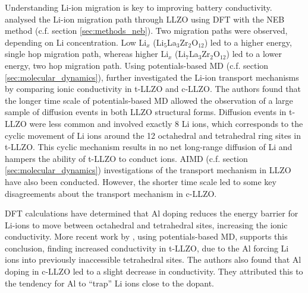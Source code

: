 \documentclass[../main.tex]{subfiles}
\begin{document}
Understanding Li-ion migration is key to improving battery conductivity. \citeauthor{Xu2012} analysed the Li-ion migration path through LLZO using DFT with the NEB method (c.f. section \ref{sec:methods_neb}).\cite{Xu2012} Two migration paths were observed, depending on Li concentration. Low Li$_x$ (Li$_5$La$_3$Zr$_2$O$_{12}$) led to a higher energy, single hop migration path, whereas higher Li$_x$ (Li$_7$La$_3$Zr$_2$O$_{12}$) led to a lower energy, two hop migration path. Using potentials-based MD (c.f. section \ref{sec:molecular_dynamics}), \citeauthor{Burbano2016} further investigated the Li-ion transport mechanisms by comparing ionic conductivity in t-LLZO and c-LLZO.\cite{Burbano2016} The authors found that the longer time scale of potentials-based MD allowed the observation of a large sample of diffusion events in both LLZO structural forms. Diffusion events in t-LLZO were less common and involved exactly 8 Li ions, which corresponds to the cyclic movement of Li ions around the 12 octahedral and tetrahedral ring sites in t-LLZO. This cyclic mechanism results in no net long-range diffusion of Li and hampers the ability of t-LLZO to conduct ions. AIMD (c.f. section \ref{sec:molecular_dynamics}) investigations of the transport mechanism in LLZO have also been conducted. However, the shorter time scale led to some key disagreements about the transport mechanism in c-LLZO.\cite{Meier2014, Jalem2013, Burbano2016}

DFT calculations have determined that Al doping reduces the energy barrier for Li-ions to move between octahedral and tetrahedral sites, increasing the ionic conductivity.\cite{Rettenwander2014, Rettenwander2016} More recent work by \citeauthor{Bonilla2019}, using potentials-based MD, supports this conclusion, finding increased conductivity in t-LLZO, due to the Al forcing Li ions into previously inaccessible tetrahedral sites.\cite{Bonilla2019} The authors also found that Al doping in c-LLZO led to a slight decrease in conductivity. They attributed this to the tendency for Al to ``trap'' Li ions close to the dopant.
\end{document}
